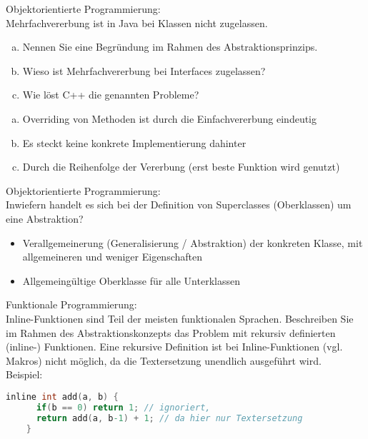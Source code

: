 \begin{card}
	Objektorientierte Programmierung:\\
	Mehrfachvererbung ist in Java bei Klassen nicht zugelassen. 
	\begin{enumerate}[a)]
	\item Nennen Sie eine Begründung im Rahmen des Abstraktionsprinzips.
	\item Wieso ist Mehrfachvererbung bei Interfaces zugelassen?
	\item Wie löst C++ die genannten Probleme?
	\end{enumerate}
	\hr
	\begin{enumerate}[a)]
	\item Overriding von Methoden ist durch die Einfachvererbung eindeutig
	\item Es steckt keine konkrete Implementierung dahinter
	\item Durch die Reihenfolge der Vererbung (erst beste Funktion wird genutzt)
	\end{enumerate}
\end{card}

\begin{card}
	Objektorientierte Programmierung:\\
	Inwiefern handelt es sich bei der Definition von Superclasses (Oberklassen) um eine Abstraktion?
	\hr
	\begin{itemize}
	\item Verallgemeinerung (Generalisierung / Abstraktion) der konkreten Klasse, mit allgemeineren und weniger Eigenschaften
	\item Allgemeingültige Oberklasse für alle Unterklassen
	\end{itemize}
\end{card}

\begin{card}
	Funktionale Programmierung:\\
	Inline-Funktionen sind Teil der meisten funktionalen Sprachen. Beschreiben Sie im Rahmen des Abstraktionskonzepts das Problem mit rekursiv definierten (inline-) Funktionen.
	\hr
	Eine rekursive Definition ist bei Inline-Funktionen (vgl. Makros) nicht möglich, da die Textersetzung unendlich ausgeführt wird.\\
	Beispiel:\\
	\begin{lstlisting}[language=C]
	inline int add(a, b) {
	  if(b == 0) return 1; // ignoriert,
	  return add(a, b-1) + 1; // da hier nur Textersetzung
	}
	\end{lstlisting}
	
\end{card}

